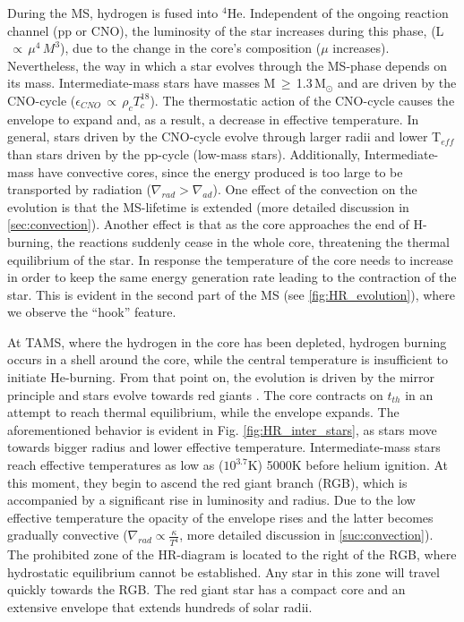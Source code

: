 During the MS, hydrogen is fused into $^4$He. Independent of the ongoing reaction channel (pp or CNO), the luminosity of the star increases during this phase, (L$\,\propto\,\mu^{4}\,M^3$), due to the change in the core's composition ($\mu$ increases). Nevertheless, the way in which a star evolves through the MS-phase depends on its mass. Intermediate-mass stars have masses M\,$\geq$\,1.3\,M$_\odot$ and are driven by the CNO-cycle ($\epsilon_{CNO}\,\propto\,\rho_{c}T^{18}_{c}$). The thermostatic action of the CNO-cycle causes the envelope to expand and, as a result, a decrease in effective temperature. In general, stars driven by the CNO-cycle evolve through larger radii and lower T$_{eff}$ than stars driven by the pp-cycle (low-mass stars). Additionally, Intermediate-mass have convective cores, since the energy produced is too large to be transported by radiation ($\nabla_{rad} > \nabla_{ad}$). One effect of the convection on the evolution is that the MS-lifetime is extended (more detailed discussion in \cref{sec:convection}). Another effect is that as the core approaches the end of H-burning, the reactions suddenly cease in the whole core, threatening the thermal equilibrium of the star. In response the temperature of the core needs to increase in order to keep the same energy generation rate leading to the contraction of the star. This is evident in the second part of the MS (see \cref{fig:HR_evolution}), where we observe the ``hook'' feature. 

At TAMS, where the hydrogen in the core has been depleted, hydrogen burning occurs in a shell around the core, while the central temperature is insufficient to initiate He-burning. From that point on, the evolution is driven by the mirror principle and stars evolve towards red giants \citep{pols2011stellar}. The core contracts on $t_{th}$ in an attempt to reach thermal equilibrium, while the envelope expands. The aforementioned behavior is evident in Fig. \ref{fig:HR_inter_stars}, as stars move towards bigger radius and lower effective temperature. Intermediate-mass stars reach effective temperatures as low as ($10^{3.7}$K) 5000K before helium ignition. At this moment, they begin to ascend the red giant branch (RGB), which is accompanied by a significant rise in luminosity and radius. Due to the low effective temperature the opacity of the envelope rises and the latter becomes gradually convective ($\nabla_{rad} \propto \frac{\kappa}{T^4}$, more detailed discussion in \cref{suc:convection}). The prohibited zone of the HR-diagram is located to the right of the RGB, where hydrostatic equilibrium cannot be established. Any star in this zone will travel quickly towards the RGB. The red giant star has a compact core and an extensive envelope that extends hundreds of solar radii. 

